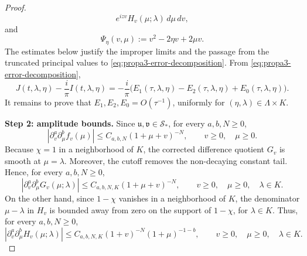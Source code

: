 \documentclass[10pt]{article}
\numberwithin{equation}{section}
\numberwithin{theorem}{section}
\begin{document}
\begin{appendix}
\begin{proof}
\begin{equation}
e^{izv}
H_v(\mu;\lambda)\,d\mu\,dv,
\end{equation}
and
\[
\Psi_\eta(v,\mu):=v^2-2\eta v+2\mu v.
\]
The estimates below justify the improper limits and the passage from the truncated
principal values to \eqref{eq:propa3-error-decomposition}. From
\eqref{eq:propa3-error-decomposition},
\begin{equation}
\label{eq:propa3-main-reduction}
J(t,\lambda,\eta)-\frac{i}{\pi}I(t,\lambda,\eta)
=
-\frac{i}{\pi}
\bigl(
E_1(\tau,\lambda,\eta)
-
E_2(\tau,\lambda,\eta)
+
E_0(\tau,\lambda,\eta)
\bigr).
\end{equation}
It remains to prove that \(E_1,E_2,E_0=O(\tau^{-1})\), uniformly for
\((\eta,\lambda)\in\Lambda\times K\).

\medskip
\noindent\textbf{Step 2: amplitude bounds.}
Since \(\mathfrak u,\mathfrak v\in\mathcal S_*\), for every \(a,b,N\ge0\),
\begin{equation}
\label{eq:propa3-f-bound}
|\partial_v^a\partial_\mu^b f_v(\mu)|
\le
C_{a,b,N}(1+\mu+v)^{-N},
\qquad v\ge0,\quad \mu\ge0.
\end{equation}
Because \(\chi=1\) in a neighborhood of \(K\), the corrected difference quotient
\(G_v\) is smooth at \(\mu=\lambda\). Moreover, the cutoff removes the non-decaying
constant tail. Hence, for every \(a,b,N\ge0\),
\begin{equation}
\label{eq:propa3-G-bound}
|\partial_v^a\partial_\mu^bG_v(\mu;\lambda)|
\le
C_{a,b,N,K}(1+\mu+v)^{-N},
\qquad v\ge0,\quad \mu\ge0,\quad \lambda\in K.
\end{equation}
On the other hand, since \(1-\chi\) vanishes in a neighborhood of \(K\), the denominator
\(\mu-\lambda\) in \(H_v\) is bounded away from zero on the support of \(1-\chi\), for
\(\lambda\in K\). Thus, for every \(a,b,N\ge0\),
\begin{equation}
\label{eq:propa3-H-bound}
|\partial_v^a\partial_\mu^bH_v(\mu;\lambda)|
\le
C_{a,b,N,K}(1+v)^{-N}(1+\mu)^{-1-b},
\qquad v\ge0,\quad \mu\ge0,\quad \lambda\in K.
\end{equation}


\end{proof}
\end{appendix}
\end{document}
